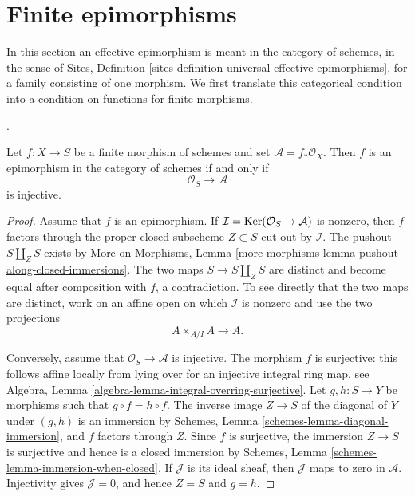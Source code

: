 \section{Finite epimorphisms}
\label{section-finite-epimorphisms}

\noindent
In this section an effective epimorphism is meant in the category of schemes,
in the sense of Sites, Definition
\ref{sites-definition-universal-effective-epimorphisms}, for a family
consisting of one morphism. We first translate this categorical condition
into a condition on functions for finite morphisms.

\begin{lemma}
\label{lemma-finite-epimorphism-injective-functions}
\begin{reference}
\cite[Expos\'e 190, n\textsuperscript{o} 2(b), p. 306]{FGA}.
\end{reference}
Let $f : X \to S$ be a finite morphism of schemes and set
$\mathcal{A} = f_*\mathcal{O}_X$. Then $f$ is an epimorphism in the category
of schemes if and only if
$$
\mathcal{O}_S \longrightarrow \mathcal{A}
$$
is injective.
\end{lemma}

\begin{proof}
Assume that $f$ is an epimorphism. If
$\mathcal{I} = \mathop{\mathrm{Ker}}(\mathcal{O}_S \to \mathcal{A})$ is nonzero, then $f$
factors through the proper closed subscheme $Z \subset S$ cut out by
$\mathcal{I}$. The pushout $S \amalg_Z S$ exists by More on Morphisms,
Lemma \ref{more-morphisms-lemma-pushout-along-closed-immersions}. The two
maps $S \to S \amalg_Z S$ are distinct and become equal after composition
with $f$, a contradiction. To see directly that the two maps are distinct,
work on an affine open on which $\mathcal{I}$ is nonzero and use the two
projections
$$
A \times_{A/I} A \longrightarrow A.
$$

\medskip\noindent
Conversely, assume that $\mathcal{O}_S \to \mathcal{A}$ is injective. The
morphism $f$ is surjective: this follows affine locally from lying over for
an injective integral ring map, see Algebra, Lemma
\ref{algebra-lemma-integral-overring-surjective}. Let $g, h : S \to Y$ be
morphisms such that $g \circ f = h \circ f$. The inverse image $Z \to S$ of
the diagonal of $Y$ under $(g, h)$ is an immersion by Schemes, Lemma
\ref{schemes-lemma-diagonal-immersion}, and $f$ factors through $Z$. Since
$f$ is surjective, the immersion $Z \to S$ is surjective and hence is a
closed immersion by Schemes, Lemma
\ref{schemes-lemma-immersion-when-closed}. If $\mathcal{J}$ is its ideal
sheaf, then $\mathcal{J}$ maps to zero in $\mathcal{A}$. Injectivity gives
$\mathcal{J} = 0$, and hence $Z = S$ and $g = h$.
\end{proof}


